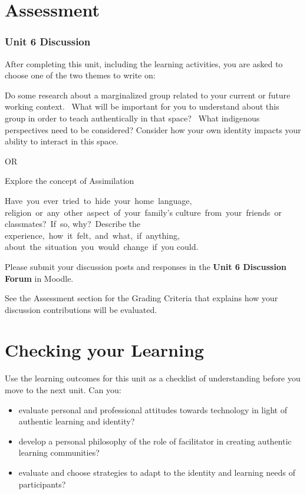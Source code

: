 \documentclass[
]{book}
\providecommand{\tightlist}{%
  \setlength{\itemsep}{0pt}\setlength{\parskip}{0pt}}
\begin{document}
\hypertarget{assessment-5}{%
\section*{Assessment}\label{assessment-5}}

\begin{assessment}
\hypertarget{unit-6-discussion}{%
\subsubsection{Unit 6 Discussion}\label{unit-6-discussion}}

After completing this unit, including the learning activities, you are
asked to choose one of the two themes to write on:

Do some research about a marginalized group related to your current or
future working context. ~What will be important for you to understand
about this group in order to teach authentically in that space? ~What
indigenous perspectives need to be considered? Consider how your own
identity impacts your ability to interact in this space. ~

OR

Explore the concept of Assimilation

Have~you~ever~tried~to~hide~your~home~language,
religion~or~any~other~aspect~of~your~family's
culture~from~your~friends~or classmates?~If~so, why?~Describe the
experience,~how~it~felt,~and~what,~if~anything,
about~the~situation~you~would~change~if~you could.

Please submit your discussion posts and responses in the \textbf{Unit 6
Discussion Forum} in Moodle.

See the Assessment section for the Grading Criteria that explains how
your discussion contributions will be evaluated.
\end{assessment}

\hypertarget{checking-your-learning-5}{%
\section*{Checking your Learning}\label{checking-your-learning-5}}

\begin{progress}
Use the learning outcomes for this unit as a checklist of understanding
before you move to the next unit. Can you:

\begin{itemize}
\tightlist
\item
  evaluate personal and professional attitudes towards technology in
  light of authentic learning and identity?
\item
  develop a personal philosophy of the role of facilitator in creating
  authentic learning communities?
\item
  evaluate and choose strategies to adapt to the identity and learning
  needs of participants?
\end{itemize}
\end{progress}
\end{document}
